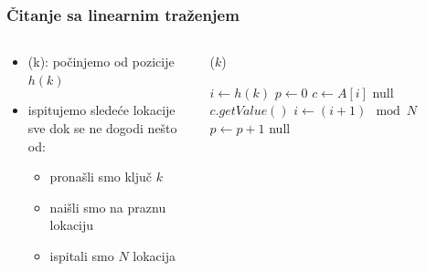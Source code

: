 \documentclass[compress]{beamer}
\begin{document}
\begin{frame}[fragile]
  \frametitle{Čitanje sa linearnim traženjem}
  \begin{columns}
    \begin{column}[c]{6cm}
      \begin{itemize}
        \item {}(k): počinjemo od pozicije $h(k)$
        \item ispitujemo sledeće lokacije sve dok se ne dogodi nešto od:
        \begin{itemize}
          \item pronašli smo ključ $k$
          \item naišli smo na praznu lokaciju
          \item ispitali smo $N$ lokacija
        \end{itemize}
      \end{itemize}
    \end{column}
    \begin{column}[c]{5cm}
      ($k$)
      \begin{algorithmic}
        \small
        \STATE $i \leftarrow h(k)$
        \STATE $p \leftarrow 0$
        \REPEAT
          \STATE $c \leftarrow A[i]$
            \RETURN null
          \ELSE 
              \RETURN $c.getValue()$
            \ELSE
              \STATE $i \leftarrow (i+1)\mod N$
              \STATE $p \leftarrow p+1$
            \ENDIF
          \ENDIF
        \RETURN null
      \end{algorithmic}
    \end{column}
  \end{columns}
\end{frame}
\end{document}
